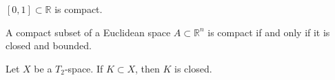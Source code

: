 \begin{thmbox}
    \begin{lemma}
        \([0, 1] \subset \mathbb{R}\) is {\color{maththen}compact}.
    \end{lemma}
\end{thmbox}

\begin{thmbox}
    \begin{theorem}
        A compact subset of a Euclidean space \(A \subset \mathbb{R}^n\) is compact if and only if it is closed and bounded.
    \end{theorem}
\end{thmbox}

\begin{thmbox}
    \begin{proposition}
        Let \(X\) be a \(T_2\)-space. If \(K \subset X\), then \(K\) is closed.
    \end{proposition}
\end{thmbox}